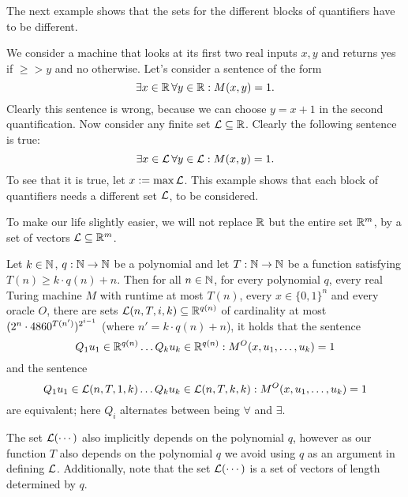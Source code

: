 \documentclass{article}
\begin{document}
The next example shows that the sets for the different blocks of quantifiers have to be different.
\begin{example}
    We consider a machine that looks at its first two real inputs $x,y$ and 
    returns yes if $\geq>y$ and no otherwise.
    Let's consider a sentence of the form 
    \[\exists x\in \mathbb{R} \,\forall y\in \mathbb{R} : M(x,y) = 1.\]
    Clearly this sentence is wrong, because we can choose $y = x+1$ in the second quantification.
    Now consider any finite set $\mathcal{L} \subseteq \mathbb{R}$.
    Clearly the following sentence is true:
    \[\exists x\in \mathcal{L} \, \forall y\in \mathcal{L} : M(x,y) = 1.\]
    To see that it is true, let $x:= \max \mathcal{L}$.
    This example shows that each block of quantifiers needs a different set $\mathcal{L}$, to be considered.
\end{example}


To make our life slightly easier, we will not replace $\mathbb{R}$ but the entire set $\mathbb{R}^m$, by a set of vectors $\mathcal{L} \subseteq \mathbb{R}^m$.


\begin{lemma}
    \label{lem:ConstrainedQuantifierRanges}
    Let \(k \in \mathbb{N}\), $q:\mathbb{N} \rightarrow \mathbb{N}$ be a polynomial and let $T:\mathbb{N} \rightarrow \mathbb{N}$ be a function satisfying $T(n) \geq k\cdot q(n)+n$. Then for all $n\in \mathbb{N}$, for every polynomial $q$, every real Turing machine \(M\) with runtime at most $T(n)$, every $x \in \{0,1\}^n$ and every oracle $O$, there are sets \(\mathcal{L}(n, T,i, k) \subseteq \mathbb{R}^{q(n)}\) of cardinality at most 
    \(  (2^n \cdot 4860^{T(n')})^{2^{i-1}} \) (where $n'=k\cdot q(n)+n$), it holds that the sentence
    \[ Q_1 u_1 \in \mathbb{R}^{q(n)} \ldots Q_k u_k \in  \mathbb{R}^{q(n)}  : M^O(x, u_1,\ldots,u_k) =1\]
    and the sentence
    \[ Q_1 u_1 \in \mathcal{L}(n, T, 1,k) \ldots Q_k u_k \in \mathcal{L}(n, T, k,k) : M^O(x, u_1,\ldots,u_k) =1\]
are equivalent; here $Q_i$ alternates between being $\forall$ and $\exists$.
\end{lemma}

\begin{remark}
The set $\mathcal{L}(\cdots)$ also implicitly depends on the polynomial $q$, however as our function $T$ also depends on the polynomial $q$ we avoid using $q$ as an argument in defining $\mathcal{L}$.
Additionally, note that the set $\mathcal{L}(\cdots)$ is a set of vectors of length determined by $q$. 
\end{remark}
\end{document}
